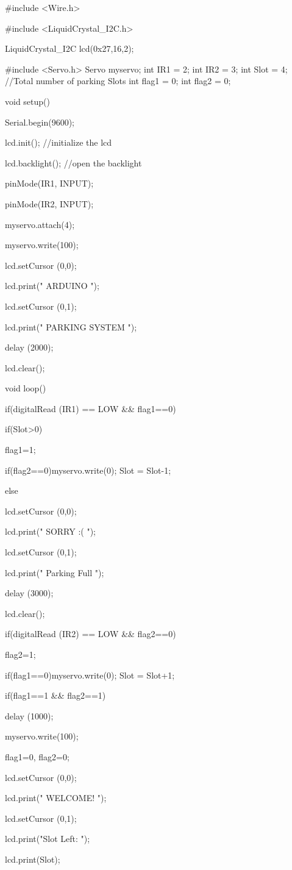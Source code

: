 #include <Wire.h> 

#include <LiquidCrystal_I2C.h>

LiquidCrystal_I2C lcd(0x27,16,2);   

#include <Servo.h> 
Servo myservo;
int IR1 = 2;
int IR2 = 3;
int Slot = 4;           //Total number of parking Slots
int flag1 = 0;
int flag2 = 0;

void setup() {

  Serial.begin(9600); 

    lcd.init(); //initialize the lcd

    lcd.backlight(); //open the backlight

 pinMode(IR1, INPUT);

pinMode(IR2, INPUT);

  myservo.attach(4);

myservo.write(100);


lcd.setCursor (0,0);

lcd.print("     ARDUINO    ");

lcd.setCursor (0,1);

lcd.print(" PARKING SYSTEM ");

delay (2000);

lcd.clear();  

}


void loop(){ 

if(digitalRead (IR1) == LOW && flag1==0){

if(Slot>0){flag1=1;

if(flag2==0){myservo.write(0); Slot = Slot-1;}

}
else{

lcd.setCursor (0,0);

lcd.print("    SORRY :(    ");  

lcd.setCursor (0,1);

lcd.print("  Parking Full  "); 

delay (3000);

lcd.clear(); 

}

}



if(digitalRead (IR2) == LOW && flag2==0){flag2=1;

if(flag1==0){myservo.write(0); Slot = Slot+1;}

}
if(flag1==1 && flag2==1){

delay (1000);

myservo.write(100);

flag1=0, flag2=0;

}



lcd.setCursor (0,0);

lcd.print("    WELCOME!    ");

lcd.setCursor (0,1);

lcd.print("Slot Left: ");

lcd.print(Slot);

}
